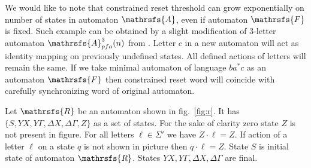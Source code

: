 \documentclass[11pt]{llncs}
\newcommand{\A}{\mathrsfs{A}}
\newcommand{\R}{\mathrsfs{R}}
\newcommand{\G}{\Gamma}
\newcommand{\D}{\Delta}
\newcommand{\rtc}{rt_{c}}
\begin{document}
We would like to note that constrained reset threshold can grow exponentially on number of states in automaton $\A$, even
if automaton $\mathrsfs{F}$ is fixed. Such example can be obtained by a slight modification of 3-letter automaton $\mathrsfs{A}^3_{pfa}(n)$
from \cite{Mart}. Letter $c$ in a new automaton will act as identity mapping on previously undefined states. All defined actions
of letters will remain the same. %
If we take minimal automaton of language $ba^*c$ as an automaton $\mathrsfs{F}$ then constrained reset word will coincide 
with carefully synchronizing word of original automaton.


Let $\R$ be an automaton shown in fig.~\ref{fig:r}. It has $\{S, YX, Y\G , \D X, \D \G, Z\}$ as a set of states.
For the sake of clarity zero state $Z$ is not present in figure. For all letters $\ell \in \Sigma'$ we have 
$Z \cdot \ell = Z$. If action of a letter $\ell$ on a state $q$ is not shown in picture then $q \cdot \ell = Z$.
State $S$ is initial state of automaton $\R$. States $YX, Y\G , \D X, \D \G$ are final.
\end{document}
